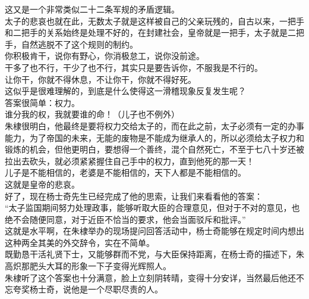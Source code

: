 \begin{multicols}{\theparacolNo}
这又是一个非常类似二十二条军规的矛盾逻辑。\\

太子的悲哀也就在此，无数太子就是这样被自己的父亲玩残的，自古以来，一把手和二把手的关系始终是处理不好的，在封建社会，皇帝就是一把手，太子就是二把手，自然逃脱不了这个规则的制约。\\

你积极肯干，说你有野心，你消极怠工，说你没前途。\\

干多了也不行，干少了也不行，其实只是要告诉你，不服我是不行的。\\

让你干，你就不得休息，不让你干，你就不得好死。\\

这似乎是很难理解的，到底是什么使得这一滑稽现象反复发生呢？\\

答案很简单：权力。\\

谁分我的权，我就要谁的命！（儿子也不例外）\\

朱棣很明白，他最终是要将权力交给太子的，而在此之前，太子必须有一定的办事能力，为了帝国的未来，无能的废物是不能成为继承人的，所以必须给太子权力和锻炼的机会，但他更明白，要想得一个善终，混个自然死亡，不至于七八十岁还被拉出去砍头，就必须紧紧握住自己手中的权力，直到他死的那一天！\\

儿子是不能相信的，老婆是不能相信的，天下人都是不能相信的。\\

这就是皇帝的悲哀。\\

好了，现在杨士奇先生已经完成了他的思索，让我们来看看他的答案：\\

“太子监国期间努力处理政事，能够听取大臣的合理意见，但对于不对的意见，也绝不会随便同意，对于近臣不恰当的要求，他会当面驳斥和批评。”\\

这就是水平啊，在朱棣举办的现场提问回答活动中，杨士奇能够在规定时间内想出这种两全其美的外交辞令，实在不简单。\\

既勤恳干活礼贤下士，又能够群而不党，与大臣保持距离，在杨士奇的描述下，朱高炽那肥头大耳的形象一下子变得光辉照人。\\

朱棣听了这个答案也十分满意，脸上立刻阴转晴，变得十分安详，当然最后他还不忘夸奖杨士奇，说他是一个尽职尽责的人。\\


\end{multicols}
